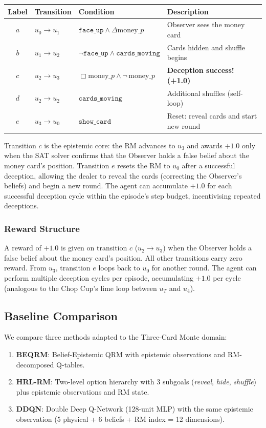 \documentclass[11pt]{article}
\newcommand{\EBel}[1]{\ensuremath{\Delta #1}} %
\newcommand{\IBel}[1]{\ensuremath{\Box #1}}   %
\begin{document}
\begin{center}
\begin{tabular}{clll}
\toprule
\textbf{Label} & \textbf{Transition} & \textbf{Condition} & \textbf{Description} \\
\midrule
$a$ & $u_0 \to u_1$ & $\texttt{face\_up} \land \EBel{\text{money}\_p}$ & Observer sees the money card \\
$b$ & $u_1 \to u_2$ & $\neg\texttt{face\_up} \land \texttt{cards\_moving}$ & Cards hidden and shuffle begins \\
$c$ & $u_2 \to u_3$ & $\IBel{\text{money}\_p} \land \neg\,\text{money}\_p$ & \textbf{Deception success! (+1.0)} \\
$d$ & $u_2 \to u_2$ & $\texttt{cards\_moving}$ & Additional shuffles (self-loop) \\
$e$ & $u_3 \to u_0$ & $\texttt{show\_card}$ & Reset: reveal cards and start new round \\
\bottomrule
\end{tabular}
\end{center}

Transition $c$ is the epistemic core: the RM advances to $u_3$ and awards $+1.0$ only when the SAT solver confirms that the Observer holds a false belief about the money card's position.
Transition $e$ resets the RM to $u_0$ after a successful deception, allowing the dealer to reveal the cards (correcting the Observer's beliefs) and begin a new round.
The agent can accumulate $+1.0$ for each successful deception cycle within the episode's step budget, incentivising repeated deceptions.

\subsubsection{Reward Structure}

A reward of $+1.0$ is given on transition $c$ ($u_2 \to u_3$) when the Observer holds a false belief about the money card's position. All other transitions carry zero reward.
From $u_3$, transition $e$ loops back to $u_0$ for another round. The agent can perform multiple deception cycles per episode, accumulating $+1.0$ per cycle (analogous to the Chop Cup's lime loop between $u_T$ and $u_4$).

\subsection{Baseline Comparison}

We compare three methods adapted to the Three-Card Monte domain:
\begin{enumerate}
    \item \textbf{BEQRM}: Belief-Epistemic QRM with epistemic observations and RM-decomposed Q-tables.

    \item \textbf{HRL-RM}: Two-level option hierarchy with 3 subgoals (\emph{reveal}, \emph{hide}, \emph{shuffle}) plus epistemic observations and RM state.

    \item \textbf{DDQN}: Double Deep Q-Network (128-unit MLP) with the same epistemic observation (5 physical + 6 beliefs + RM index = 12 dimensions).
\end{enumerate}
\end{document}
